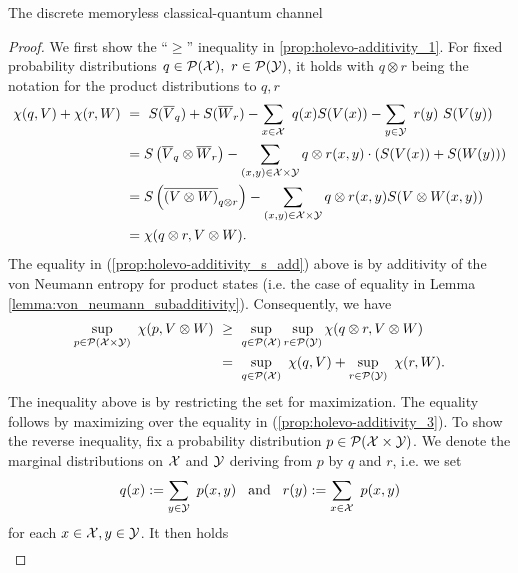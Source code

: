 \begin{section}{The discrete memoryless  classical-quantum channel}
      \begin{proof}
       We first show the ``$\geq$'' inequality in \ref{prop:holevo-additivity_1}. For fixed probability distributions $q \in {\mathcal P}({\mathcal X}),\ r \in {\mathcal P}({\mathcal Y})$, it holds with $q \otimes r$ being the notation for the product distributions to $q,r$
       \begin{align}
        \chi(q,V) + \chi(r,W) \ 
        &= \ S(\overline{V}_q) + S(\overline{W}_r) - \sum_{x \in \cX} \ q(x) S(V(x)) - \sum_{y \in \cY} \ r(y) \ S(V(y)) \nonumber \\
        &= S\left(\overline{V}_q \otimes \overline{W}_r\right) - \sum_{(x,y) \in \cX \times \cY} q \otimes r(x,y) \cdot \left(S(V(x))  + S(W(y))\right) \label{prop:holevo-additivity_s_add}\\
        &= S\left(\overline{(V \otimes W)}_{q \otimes r}\right) - \sum_{(x,y) \in \cX \times \cY} q \otimes r(x,y) S(V \otimes W(x,y)) \nonumber \\
        &= \chi(q \otimes r, V \otimes W). \label{prop:holevo-additivity_3}
        \end{align}
      The equality in (\ref{prop:holevo-additivity_s_add}) above is by additivity of the von Neumann entropy for product states (i.e. the case of equality in Lemma \ref{lemma:von_neumann_subadditivity}). Consequently, we have
      \begin{align}
       \sup_{p \in \cP(\cX \times \cY)} \ \chi(p, V \otimes W) \ 
       &\geq \ \sup_{q \in \cP(\cX)}\sup_{r \in \cP(\cY)} \chi(q \otimes r, V \otimes W) \nonumber \\ 
       &= \ \sup_{q \in \cP(\cX)} \ \chi(q, V) + \sup_{r \in \cP(\cY)} \ \chi(r,W). \label{prop:holevo-additivity_4}
      \end{align}
      The inequality above is by restricting the set for maximization. The equality follows by maximizing over the equality in (\ref{prop:holevo-additivity_3}). \newline 
      To show the reverse inequality, fix a probability distribution
      $p \in {\mathcal P}({\mathcal X} \times {\mathcal Y})$. We denote the marginal distributions on ${\mathcal X}$ and ${\mathcal Y}$ deriving from $p$ by $q$ and $r$, i.e. we set
      \begin{align*}
       q(x) := \sum_{y \in {\mathcal Y}} \ p(x,y) \hspace{.3cm} \text{and} \hspace{.3cm} r(y) := \sum_{x \in {\mathcal X}} \ p(x,y) 
      \end{align*}
      for each $x \in {\mathcal X}, y \in {\mathcal Y}$. 
      It then holds 
      \begin{align*}

\end{align*}
\end{proof}
\end{section}
